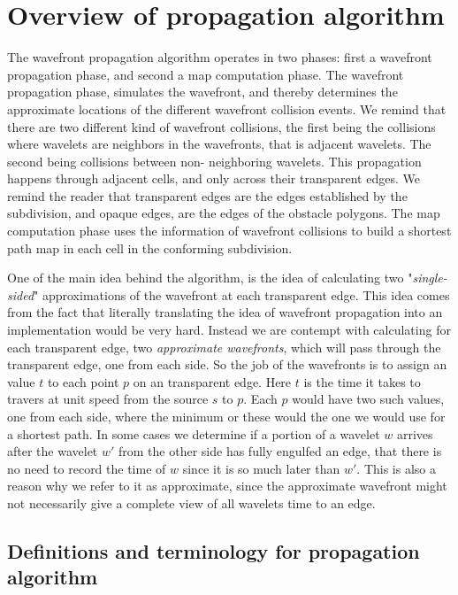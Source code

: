 \section{Overview of propagation algorithm}

The wavefront propagation algorithm operates in two phases: first a wavefront 
propagation phase, and second a map computation phase. The wavefront propagation 
phase, simulates the wavefront, and thereby determines the approximate locations of 
the different wavefront collision events. We remind that there are two different kind 
of wavefront collisions, the first being the collisions where wavelets are neighbors 
in the wavefronts, that is adjacent wavelets. The second being collisions between non-
neighboring wavelets. This propagation happens through adjacent cells, and only across 
their transparent edges. We remind the reader that transparent edges are the edges 
established by the subdivision, and opaque edges, are the edges of the obstacle 
polygons. The map computation phase uses the information of wavefront collisions to 
build a shortest path map in each cell in the conforming subdivision. 

One of the main idea behind the algorithm, is the idea of calculating two 
"\textit{single-sided}" approximations of the wavefront at each transparent edge. This 
idea comes from the fact that literally translating the idea of wavefront propagation  
into an implementation would be very hard. Instead we are contempt with calculating 
for each transparent edge, two \textit{approximate wavefronts}, which will pass 
through the transparent edge, one from each side. So the job of the wavefronts is to 
assign an value $t$ to each point $p$ on an transparent edge. Here $t$ is the time it 
takes to travers at unit speed from the source $s$ to $p$. Each $p$ would have two 
such values, one from each side, where the minimum or these would the one we would use 
for a shortest path. In some cases we determine if a portion of a wavelet $w$ arrives 
after the wavelet $w'$ from the other side has fully engulfed an edge, that there is 
no need to record the time of $w$ since it is so much later than $w'$. This is also a 
reason why we refer to it as approximate, since the approximate wavefront might not 
necessarily give a complete view of all wavelets time to an edge.

\subsection{Definitions and terminology for propagation algorithm}

